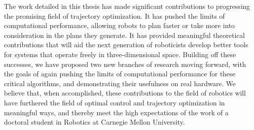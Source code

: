 \documentclass[../root.tex]{subfiles}
\begin{document}
The work detailed in this thesis has made significant contributions to
progressing the promising field of trajectory optimization. It has pushed the
limits of computational performance, allowing robots to plan faster or take
more into consideration in the plans they generate. It has provided
meaningful theoretical contributions that will aid the next generation of
roboticists develop better tools for systems that operate freely in
three-dimensional space. Building off these successes, we have proposed two
new branches of research moving forward, with the goals of again pushing the
limits of computational performance for these critical algorithms, and
demonstrating their usefulness on real hardware. We believe that, when
accomplished, these contributions to the field of robotics will have
furthered the field of optimal control and trajectory optimization in
meaningful ways, and thereby meet the high expectations of the work of a
doctoral student in Robotics at Carnegie Mellon University.
\end{document}
